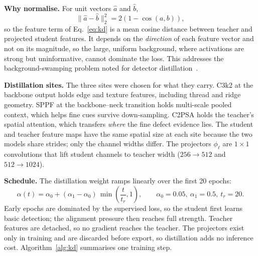 \noindent\textbf{Why normalise.} For unit vectors $\hat a$ and $\hat b$,
\begin{equation}
    \|\hat a-\hat b\|_2^2 = 2\left(1-\cos(a,b)\right),
    \label{eq:cosine}
\end{equation}
so the feature term of Eq.~\eqref{eq:kd} is a mean cosine distance between teacher and projected student features. It depends on the \emph{direction} of each feature vector and not on its magnitude, so the large, uniform background, where activations are strong but uninformative, cannot dominate the loss. This addresses the background-swamping problem noted for detector distillation~\cite{wang2019fgfi}.

\noindent\textbf{Distillation sites.} The three sites were chosen for what they carry. C3k2 at the backbone output holds edge and texture features, including thread and ridge geometry. SPPF at the backbone--neck transition holds multi-scale pooled context, which helps fine cues survive down-sampling. C2PSA holds the teacher's spatial attention, which transfers \emph{where} the fine defect evidence lies. The student and teacher feature maps have the same spatial size at each site because the two models share strides; only the channel widths differ. The projectors $\phi_\ell$ are $1{\times}1$ convolutions that lift student channels to teacher width ($256\rightarrow512$ and $512\rightarrow1024$).

\noindent\textbf{Schedule.} The distillation weight ramps linearly over the first 20 epochs:
\begin{equation}
    \alpha(t) = \alpha_0 + (\alpha_1-\alpha_0)\,\min\!\left(\frac{t}{t_r},1\right),\qquad \alpha_0=0.05,\ \alpha_1=0.5,\ t_r=20.
    \label{eq:ramp}
\end{equation}
Early epochs are dominated by the supervised loss, so the student first learns basic detection; the alignment pressure then reaches full strength. Teacher features are detached, so no gradient reaches the teacher. The projectors exist only in training and are discarded before export, so distillation adds no inference cost. Algorithm~\ref{alg:kd} summarises one training step.

